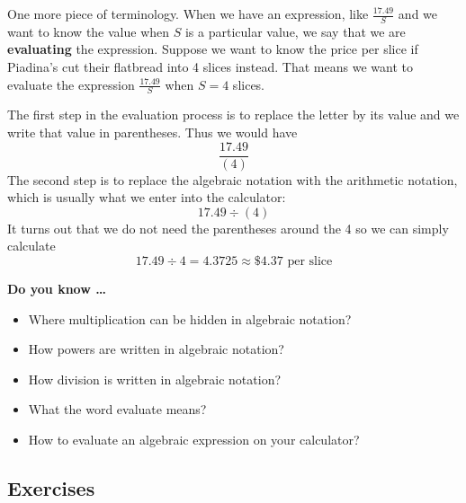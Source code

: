 One more piece of terminology.  When we have an expression, like $ \frac{17.49}{S}$ and we want to know the value when $S$ is a particular value, we say that we are \textbf{evaluating} the expression.  Suppose we want to know the price per slice if Piadina's cut their flatbread into 4 slices instead.  That means we want to evaluate the expression $ \frac{17.49}{S}$ when $S = 4$ slices.  

The first step in the evaluation process is to replace the letter by its value and we write that value in parentheses.  Thus we would have $$\frac{17.49}{(4)}$$ The second step is to replace the algebraic notation with the arithmetic notation, which is usually what we enter into the calculator:
$$17.49 \div (4)$$
It turns out that we do not need the parentheses around the 4 so we can simply calculate $$ 17.49 \div 4 = 4.3725 \approx \$4.37 \text{ per slice}$$

 

\noindent \textbf{Do you know \ldots}

\begin{itemize}
\item Where multiplication can be hidden in algebraic notation? %
\item How powers are written in algebraic notation?%
\item How division is written in algebraic notation? %
\item What the word evaluate means? %
\item How to evaluate an algebraic expression on your calculator? %
  
\end{itemize}

\subsection*{Exercises}

